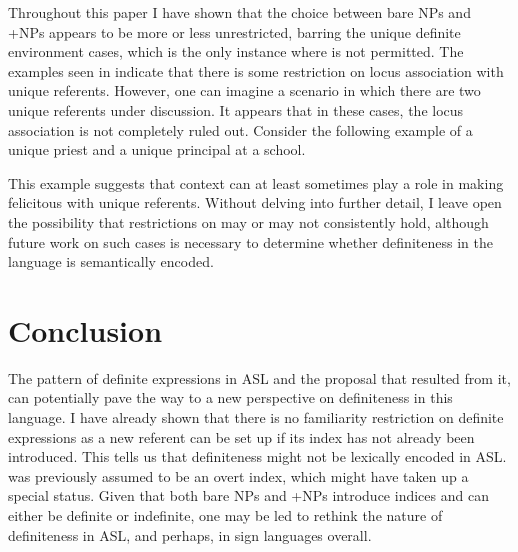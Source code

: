 \documentclass[output=paper,
modfonts
]{langscibook}
\begin{document}
Throughout this paper I have shown that the choice between bare NPs and \,+\linebreak NPs appears to be more or less unrestricted, barring the unique definite environment cases, which is the only instance where  is not permitted. The examples seen in  indicate that there is some restriction on locus association with unique referents. However, one can imagine a scenario in which there are two unique referents under discussion. It appears that in these cases, the locus association is not completely ruled out. Consider the following example of a unique priest and a unique principal at a school. 

\begin{exe} 
	
	
\end{exe} 

\noindent This example suggests that context can at least sometimes play a role in making  felicitous with unique referents. Without delving into further detail, I leave open the possibility that  restrictions on  may or may not consistently hold, although future work on such cases is necessary to determine whether definiteness in the language is semantically encoded.  

\section{Conclusion}

The pattern of definite expressions in ASL and the proposal that resulted from it, can potentially pave the way to a new perspective on definiteness in this language. I have already shown that there is no familiarity restriction on definite expressions as a new referent can be set up if its index has not already been introduced. This tells us that definiteness might not be lexically encoded in ASL.  was previously assumed to be an overt index, which might have taken up a special status. Given that both bare NPs and +NPs introduce indices and can either be definite or indefinite, one may be led to rethink the nature of definiteness in ASL, and perhaps, in sign languages overall. 
\end{document}
